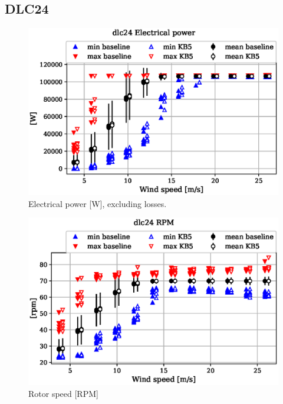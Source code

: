
\subsection{DLC24}
\label{sec:baseline-vs-KB6:dlc24}

\begin{figure}[!ht]
\begin{center}
	\includegraphics[width=.85\linewidth]{figures/baseline-vs-KB6/dlc24/DLL-generator_servo-inpvec-2_AA0008_AA0008.eps}
\end{center}
\caption{Electrical power [W], excluding losses.}
\label{fig:baseline-vs-KB6:dlc24:power}
\end{figure}

\begin{figure}[!ht]
\begin{center}
	\includegraphics[width=.85\linewidth]{figures/baseline-vs-KB6/dlc24/bearing-shaft_rot-angle_speed-rpm_AA0008_AA0008.eps}
\end{center}
\caption{Rotor speed [RPM]}
\label{fig:baseline-vs-KB6:dlc24:rpm}
\end{figure}


